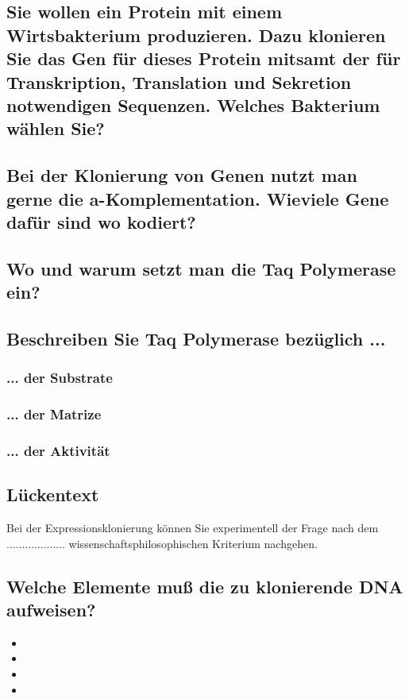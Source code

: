 \documentclass{article}
\begin{document}
\subsection*{Sie wollen ein Protein mit einem Wirtsbakterium produzieren. Dazu klonieren
Sie das Gen für dieses Protein mitsamt der für Transkription, Translation und Sekretion notwendigen Sequenzen. Welches Bakterium wählen Sie?}
\bigskip\bigskip\bigskip\bigskip


\subsection*{Bei der Klonierung von Genen nutzt man gerne die a-Komplementation.
Wieviele Gene dafür sind wo kodiert?}
\bigskip\bigskip\bigskip\bigskip\bigskip\bigskip\bigskip\bigskip\bigskip\bigskip\bigskip\bigskip

\subsection*{Wo und warum setzt man die Taq Polymerase ein?}
\bigskip\bigskip\bigskip\bigskip
\subsection*{Beschreiben Sie Taq Polymerase bezüglich ...}
\subsubsection*{... der Substrate}
\bigskip\bigskip
\subsubsection*{... der Matrize}
\bigskip\bigskip
\subsubsection*{... der Aktivität}
\bigskip\bigskip
\subsection*{Lückentext}
Bei der Expressionsklonierung können Sie experimentell der Frage nach dem ................... wissenschaftsphilosophischen Kriterium nachgehen. 
\subsection*{Welche Elemente muß die zu klonierende DNA aufweisen?}
\begin{itemize}
    \item 
    \item 
    \item 
    \item 
\end{itemize}
\end{document}
